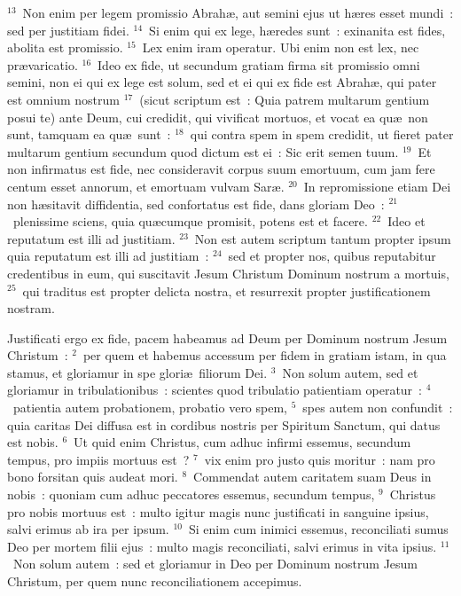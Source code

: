 ${}^{13}$~Non enim per legem promissio Abrah\ae , aut semini ejus ut h\ae res esset mundi~: sed per justitiam fidei.
${}^{14}$~Si enim qui ex lege, h\ae redes sunt~: exinanita est fides, abolita est promissio.
${}^{15}$~Lex enim iram operatur. Ubi enim non est lex, nec pr\ae varicatio.
${}^{16}$~Ideo ex fide, ut secundum gratiam firma sit promissio omni semini, non ei qui ex lege est solum, sed et ei qui ex fide est Abrah\ae , qui pater est omnium nostrum
${}^{17}$~(sicut scriptum est~: Quia patrem multarum gentium posui te) ante Deum, cui credidit, qui vivificat mortuos, et vocat ea qu\ae\ non sunt, tamquam ea qu\ae\ sunt~:
${}^{18}$~qui contra spem in spem credidit, ut fieret pater multarum gentium secundum quod dictum est ei~: Sic erit semen tuum.
${}^{19}$~Et non infirmatus est fide, nec consideravit corpus suum emortuum, cum jam fere centum esset annorum, et emortuam vulvam Sar\ae .
${}^{20}$~In repromissione etiam Dei non h\ae sitavit diffidentia, sed confortatus est fide, dans gloriam Deo~:
${}^{21}$~plenissime sciens, quia qu\ae cumque promisit, potens est et facere.
${}^{22}$~Ideo et reputatum est illi ad justitiam.
${}^{23}$~Non est autem scriptum tantum propter ipsum quia reputatum est illi ad justitiam~:
${}^{24}$~sed et propter nos, quibus reputabitur credentibus in eum, qui suscitavit Jesum Christum Dominum nostrum a mortuis,
${}^{25}$~qui traditus est propter delicta nostra, et resurrexit propter justificationem nostram.

\lettrine[lines=10,image=true,loversize=0.05,lraise=-0.03]{J}{}ustificati ergo ex fide, pacem habeamus ad Deum per Dominum nostrum Jesum Christum~:
${}^{2}$~per quem et habemus accessum per fidem in gratiam istam, in qua stamus, et gloriamur in spe glori\ae\ filiorum Dei.
${}^{3}$~Non solum autem, sed et gloriamur in tribulationibus~: scientes quod tribulatio patientiam operatur~:
${}^{4}$~patientia autem probationem, probatio vero spem,
${}^{5}$~spes autem non confundit~: quia caritas Dei diffusa est in cordibus nostris per Spiritum Sanctum, qui datus est nobis.
${}^{6}$~Ut quid enim Christus, cum adhuc infirmi essemus, secundum tempus, pro impiis mortuus est~?
${}^{7}$~vix enim pro justo quis moritur~: nam pro bono forsitan quis audeat mori.
${}^{8}$~Commendat autem caritatem suam Deus in nobis~: quoniam cum adhuc peccatores essemus, secundum tempus,
${}^{9}$~Christus pro nobis mortuus est~: multo igitur magis nunc justificati in sanguine ipsius, salvi erimus ab ira per ipsum.
${}^{10}$~Si enim cum inimici essemus, reconciliati sumus Deo per mortem filii ejus~: multo magis reconciliati, salvi erimus in vita ipsius.
${}^{11}$~Non solum autem~: sed et gloriamur in Deo per Dominum nostrum Jesum Christum, per quem nunc reconciliationem accepimus.


